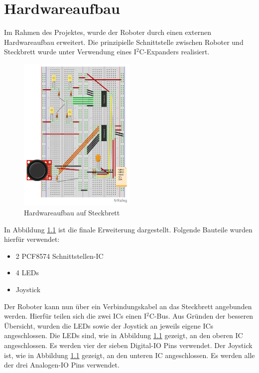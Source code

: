 \chapter{Hardwareaufbau}

Im Rahmen des Projektes, wurde der Roboter durch einen externen Hardwareaufbau erweitert. Die prinzipielle Schnittstelle zwischen
Roboter und Steckbrett wurde unter Verwendung eines I$^2$C-Expanders realisiert.

\begin{figure}[h]
	\centering
		\includegraphics[page=1,width=0.5\textwidth]{Dokumente/Schaltplan.pdf}
	\caption{Hardwareaufbau auf Steckbrett}
	\label{fig:hardwareaufbau}
\end{figure}

In Abbildung \ref{fig:hardwareaufbau} ist die finale Erweiterung dargestellt. Folgende Bauteile wurden hierfür verwendet:

\begin{itemize}
	\item 2 PCF8574 Schnittstellen-IC
	\item 4 LEDs
	\item Joystick
\end{itemize}
\newpage
Der Roboter kann nun über ein Verbindungskabel an das Steckbrett angebunden werden. Hierfür teilen sich die zwei ICs einen I$^2$C-Bus.
Aus Gründen der besseren Übersicht, wurden die LEDs sowie der Joystick an jeweils eigene ICs angeschlossen.\newline \newline
Die LEDs sind, wie in Abbildung \ref{fig:hardwareaufbau} gezeigt, an den oberen IC angeschlossen. Es werden vier der sieben Digital-IO Pins
verwendet.\newline \newline
Der Joystick ist, wie in Abbildung \ref{fig:hardwareaufbau} gezeigt, an den unteren IC angeschlossen. Es werden alle der drei Analogen-IO Pins verwendet.